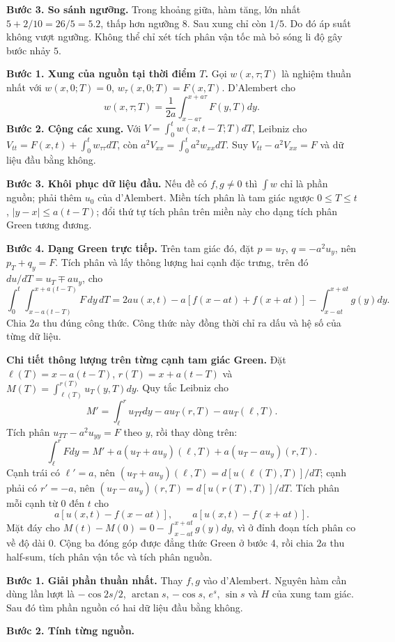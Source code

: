 \textbf{Bước 3. So sánh ngưỡng.} Trong khoảng giữa, hàm tăng, lớn nhất $5+2/10=26/5=5.2$, thấp hơn ngưỡng $8$. Sau xung chỉ còn $1/5$. Do đó áp suất không vượt ngưỡng. Không thể chỉ xét tích phân vận tốc mà bỏ sóng li độ gây bước nhảy $5$.

\textbf{Bước 1. Xung của nguồn tại thời điểm $T$.} Gọi $w(x,\tau;T)$ là nghiệm thuần nhất với $w(x,0;T)=0$, $w_\tau(x,0;T)=F(x,T)$. D'Alembert cho
\[w(x,\tau;T)=\frac1{2a}\int_{x-a\tau}^{x+a\tau}F(y,T)dy.\]
\textbf{Bước 2. Cộng các xung.} Với $V=\int_0^t w(x,t-T;T)dT$, Leibniz cho $V_{tt}=F(x,t)+\int_0^t w_{\tau\tau}dT$, còn $a^2V_{xx}=\int_0^ta^2w_{xx}dT$. Suy $V_{tt}-a^2V_{xx}=F$ và dữ liệu đầu bằng không.

\textbf{Bước 3. Khôi phục dữ liệu đầu.} Nếu đề có $f,g\ne0$ thì $\int w$ chỉ là phần nguồn; phải thêm $u_0$ của d'Alembert. Miền tích phân là tam giác ngược $0\le T\le t$, $|y-x|\le a(t-T)$; đổi thứ tự tích phân trên miền này cho dạng tích phân Green tương đương.

\textbf{Bước 4. Dạng Green trực tiếp.} Trên tam giác đó, đặt $p=u_T$, $q=-a^2u_y$, nên $p_T+q_y=F$. Tích phân và lấy thông lượng hai cạnh đặc trưng, trên đó $du/dT=u_T\mp au_y$, cho
\[\int_0^t\int_{x-a(t-T)}^{x+a(t-T)}F\,dy\,dT
=2au(x,t)-a[f(x-at)+f(x+at)]-\int_{x-at}^{x+at}g(y)dy.\]
Chia $2a$ thu đúng công thức. Công thức này đồng thời chỉ ra dấu và hệ số của từng dữ liệu.

\textbf{Chi tiết thông lượng trên từng cạnh tam giác Green.} Đặt $\ell(T)=x-a(t-T)$, $r(T)=x+a(t-T)$ và $M(T)=\int_{\ell(T)}^{r(T)}u_T(y,T)dy$. Quy tắc Leibniz cho
\[M'=\int_\ell^r u_{TT}dy-a u_T(r,T)-a u_T(\ell,T).\]
Tích phân $u_{TT}-a^2u_{yy}=F$ theo $y$, rồi thay dòng trên:
\[\int_\ell^r Fdy=M'+a(u_T+a u_y)(\ell,T)+a(u_T-a u_y)(r,T).\]
Cạnh trái có $\ell'=a$, nên $(u_T+a u_y)(\ell,T)=d[u(\ell(T),T)]/dT$; cạnh phải có $r'=-a$, nên $(u_T-a u_y)(r,T)=d[u(r(T),T)]/dT$. Tích phân mỗi cạnh từ $0$ đến $t$ cho
\[a[u(x,t)-f(x-at)],\qquad a[u(x,t)-f(x+at)].\]
Mặt đáy cho $M(t)-M(0)=0-\int_{x-at}^{x+at}g(y)dy$, vì ở đỉnh đoạn tích phân co về độ dài $0$. Cộng ba đóng góp được đẳng thức Green ở bước 4, rồi chia $2a$ thu half-sum, tích phân vận tốc và tích phân nguồn.

\textbf{Bước 1. Giải phần thuần nhất.} Thay $f,g$ vào d'Alembert. Nguyên hàm cần dùng lần lượt là $-\cos2s/2$, $\arctan s$, $-\cos s$, $e^s$, $\sin s$ và $H$ của xung tam giác. Sau đó tìm phần nguồn có hai dữ liệu đầu bằng không.

\textbf{Bước 2. Tính từng nguồn.}

